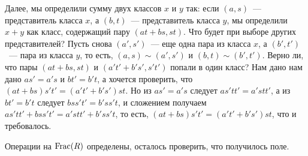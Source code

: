 Далее, мы определили сумму двух классов $x$ и $y$ так: если
$(a,s)$~--- представитель класса $x$, а
$(b,t)$~--- представитель класса $y$, мы определили $x+y$ как класс,
содержащий пару $(at+bs,st)$. Что будет при выборе других
представителей? Пусть снова $(a', s')$~--- еще одна пара из 
класса $x$, а $(b', t')$~--- пара из класса $y$, то есть,
$(a,s)\sim (a',s')$ и $(b,t)\sim(b',t')$. Верно ли, что пары
$(at+bs,st)$ и $(a't'+b's',s't')$ попали в один класс? Нам дано
нам дано $as'=a's$ и $bt'=b't$, а хочется проверить, что
$(at+bs)s't'=(a't'+b's')st$.
Но из $as'=a's$ следует $as'tt'=a'stt'$, а из $bt'=b't$ следует
$bss't'=b'ss't$, и сложением получаем $as'tt'+bss't'=a'stt'+b'ss't$,
то есть, $(at+bs)s't'=(a't'+b's')st$, что и требовалось.

Операции на $\operatorname{Frac}(R)$ определены, осталось проверить, что получилось поле.

